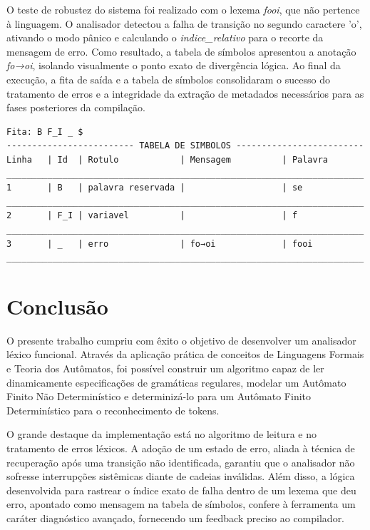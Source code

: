 \documentclass[12pt, a4paper]{article}
\begin{document}
O teste de robustez do sistema foi realizado com o lexema \textit{fooi}, que não pertence à linguagem. O analisador detectou a falha de transição no segundo caractere 'o', ativando o modo pânico e calculando o \textit{indice\_relativo} para o recorte da mensagem de erro. Como resultado, a tabela de símbolos apresentou a anotação \textit{fo→oi}, isolando visualmente o ponto exato de divergência lógica. Ao final da execução, a fita de saída e a tabela de símbolos consolidaram o sucesso do tratamento de erros e a integridade da extração de metadados necessários para as fases posteriores da compilação.
\begin{verbatim}
Fita: B F_I _ $
------------------------- TABELA DE SIMBOLOS -------------------------
Linha   | Id  | Rotulo            | Mensagem          | Palavra
______________________________________________________________________
1       | B   | palavra reservada |                   | se
______________________________________________________________________
2       | F_I | variavel          |                   | f
______________________________________________________________________
3       | _   | erro              | fo→oi             | fooi
______________________________________________________________________

\end{verbatim}

\section{Conclusão}
	O presente trabalho cumpriu com êxito o objetivo de desenvolver um analisador léxico funcional. Através da aplicação prática de conceitos de Linguagens Formais e Teoria dos Autômatos, foi possível construir um algoritmo capaz de ler dinamicamente especificações de gramáticas regulares, modelar um Autômato Finito Não Determinístico e determinizá-lo para um Autômato Finito Determinístico para o reconhecimento de tokens.

	O grande destaque da implementação está no algoritmo de leitura e no tratamento de erros léxicos. A adoção de um estado de erro, aliada à técnica de recuperação após uma transição não identificada, garantiu que o analisador não sofresse interrupções sistêmicas diante de cadeias inválidas. Além disso, a lógica desenvolvida para rastrear o índice exato de falha dentro de um lexema que deu erro, apontado como mensagem na tabela de símbolos, confere à ferramenta um caráter diagnóstico avançado, fornecendo um feedback preciso ao compilador.
\end{document}
